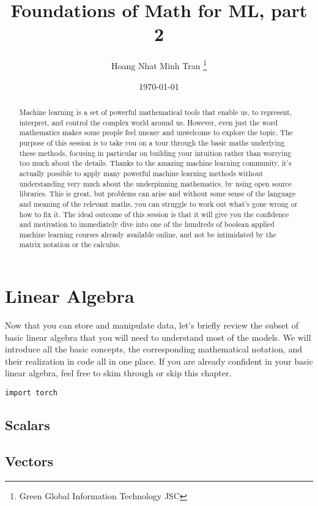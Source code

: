 \documentclass[]{article}
\title{Foundations of Math for ML, part 2}
\author{Hoang Nhat Minh Tran \thanks{Green Global Information Technology JSC}}
\date{\today}
\begin{document}
\maketitle

\begin{abstract}
Machine learning is a set of powerful mathematical tools that enable us, to represent, interpret, and control the complex world around us.
However, even just the word mathematics makes some people feel uneasy and unwelcome to explore the topic.
The purpose of this session is to take you on a tour through the basic maths underlying these methods, focusing in particular on building your intuition rather than worrying too much about the details.
Thanks to the amazing machine learning community, it's actually possible to apply many powerful machine learning methods without understanding very much about the underpinning mathematics, by using open source libraries.
This is great, but problems can arise and without some sense of the language and meaning of the relevant maths, you can struggle to work out what's gone wrong or how to fix it.
The ideal outcome of this session is that it will give you the confidence and motivation to immediately dive into one of the hundreds of boolean applied machine learning courses already available online, and not be intimidated by the matrix notation or the calculus.
\end{abstract}

\section{Linear Algebra}

Now that you can store and manipulate data, let’s briefly review the subset of basic linear algebra that you will need to understand most of the models. We will introduce all the basic concepts, the corresponding mathematical notation, and their realization in code all in one place. If you are already confident in your basic linear algebra, feel free to skim through or skip this chapter.

\begin{verbatim}
import torch
\end{verbatim}

\subsection{Scalars}

\subsection{Vectors}
\end{document}
